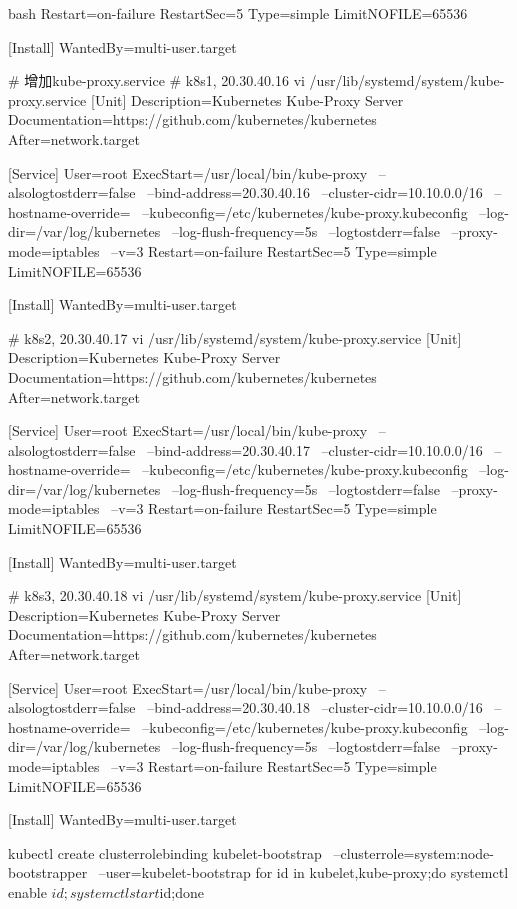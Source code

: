 \begin{outline}[enumerate]
\begin{code-in-enumerate}{bash}
Restart=on-failure
RestartSec=5
Type=simple
LimitNOFILE=65536

[Install]
WantedBy=multi-user.target

# 增加kube-proxy.service
# k8s1, 20.30.40.16
vi /usr/lib/systemd/system/kube-proxy.service
[Unit]
Description=Kubernetes Kube-Proxy Server
Documentation=https://github.com/kubernetes/kubernetes
After=network.target

[Service]
User=root
ExecStart=/usr/local/bin/kube-proxy \
    --alsologtostderr=false \
    --bind-address=20.30.40.16 \
    --cluster-cidr=10.10.0.0/16 \
    --hostname-override= \
    --kubeconfig=/etc/kubernetes/kube-proxy.kubeconfig \
    --log-dir=/var/log/kubernetes \
    --log-flush-frequency=5s \
    --logtostderr=false \
    --proxy-mode=iptables \
    --v=3
Restart=on-failure
RestartSec=5
Type=simple
LimitNOFILE=65536

[Install]
WantedBy=multi-user.target

# k8s2, 20.30.40.17
vi /usr/lib/systemd/system/kube-proxy.service
[Unit]
Description=Kubernetes Kube-Proxy Server
Documentation=https://github.com/kubernetes/kubernetes
After=network.target

[Service]
User=root
ExecStart=/usr/local/bin/kube-proxy \
    --alsologtostderr=false \
    --bind-address=20.30.40.17 \
    --cluster-cidr=10.10.0.0/16 \
    --hostname-override= \
    --kubeconfig=/etc/kubernetes/kube-proxy.kubeconfig \
    --log-dir=/var/log/kubernetes \
    --log-flush-frequency=5s \
    --logtostderr=false \
    --proxy-mode=iptables \
    --v=3
Restart=on-failure
RestartSec=5
Type=simple
LimitNOFILE=65536

[Install]
WantedBy=multi-user.target

# k8s3, 20.30.40.18
vi /usr/lib/systemd/system/kube-proxy.service
[Unit]
Description=Kubernetes Kube-Proxy Server
Documentation=https://github.com/kubernetes/kubernetes
After=network.target

[Service]
User=root
ExecStart=/usr/local/bin/kube-proxy \
    --alsologtostderr=false \
    --bind-address=20.30.40.18 \
    --cluster-cidr=10.10.0.0/16 \
    --hostname-override= \
    --kubeconfig=/etc/kubernetes/kube-proxy.kubeconfig \
    --log-dir=/var/log/kubernetes \
    --log-flush-frequency=5s \
    --logtostderr=false \
    --proxy-mode=iptables \
    --v=3
Restart=on-failure
RestartSec=5
Type=simple
LimitNOFILE=65536

[Install]
WantedBy=multi-user.target


kubectl create clusterrolebinding kubelet-bootstrap \
            --clusterrole=system:node-bootstrapper \
            --user=kubelet-bootstrap
for id in {kubelet,kube-proxy};do systemctl enable $id;systemctl start $id;done


\end{code-in-enumerate}
\end{outline}
